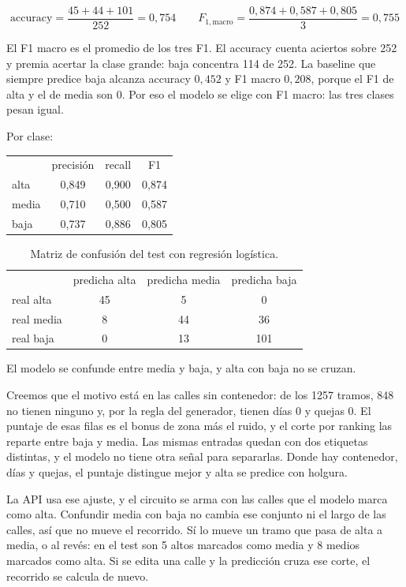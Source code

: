 \documentclass[12pt,a4paper]{report}
\begin{document}
\begin{displaymath}
\mbox{accuracy} = \frac{45 + 44 + 101}{252} = 0{,}754
\qquad
F_{1,\mathrm{macro}} = \frac{0{,}874 + 0{,}587 + 0{,}805}{3} = 0{,}755
\end{displaymath}

El F1 macro es el promedio de los tres F1. El accuracy cuenta aciertos sobre 252 y premia acertar la clase grande: baja concentra 114 de 252. La baseline que siempre predice baja alcanza accuracy $0{,}452$ y F1 macro $0{,}208$, porque el F1 de alta y el de media son 0. Por eso el modelo se elige con F1 macro: las tres clases pesan igual.

Por clase:

\begin{center}
\begin{tabular}{lccc}
 & precisión & recall & F1 \\
alta & 0,849 & 0,900 & 0,874 \\
media & 0,710 & 0,500 & 0,587 \\
baja & 0,737 & 0,886 & 0,805 \\
\end{tabular}
\end{center}

\begin{table}[htbp]
\centering
\begin{tabular}{lccc}
 & predicha alta & predicha media & predicha baja \\
real alta & 45 & 5 & 0 \\
real media & 8 & 44 & 36 \\
real baja & 0 & 13 & 101 \\
\end{tabular}
\caption{Matriz de confusión del test con regresión logística.}
\end{table}

El modelo se confunde entre media y baja, y alta con baja no se cruzan.

Creemos que el motivo está en las calles sin contenedor: de los 1257 tramos, 848 no tienen ninguno y, por la regla del generador, tienen días 0 y quejas 0. El puntaje de esas filas es el bonus de zona más el ruido, y el corte por ranking las reparte entre baja y media. Las mismas entradas quedan con dos etiquetas distintas, y el modelo no tiene otra señal para separarlas. Donde hay contenedor, días y quejas, el puntaje distingue mejor y alta se predice con holgura.

La API usa ese ajuste, y el circuito se arma con las calles que el modelo marca como alta. Confundir media con baja no cambia ese conjunto ni el largo de las calles, así que no mueve el recorrido. Sí lo mueve un tramo que pasa de alta a media, o al revés: en el test son 5 altos marcados como media y 8 medios marcados como alta. Si se edita una calle y la predicción cruza ese corte, el recorrido se calcula de nuevo.
\end{document}
